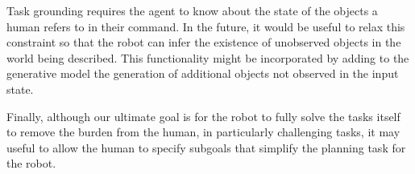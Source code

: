 \documentclass[conference]{IEEEtran}
\begin{document}
Task grounding requires the agent to know about the state of the objects a human refers to in their command. In the future, it would be useful to relax this constraint so that the robot can infer the existence of unobserved objects in the world being described. This functionality might be incorporated by adding to the generative model the generation of additional objects not observed in the input state.

Finally, although our ultimate goal is for the robot to fully solve the tasks itself to remove the burden from the human, in particularly challenging tasks, it may useful to allow the human to specify subgoals that simplify the planning task for the robot.





\end{document}
